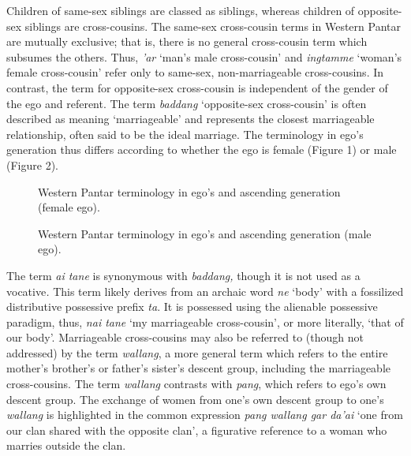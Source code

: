 Children of same-sex siblings are classed as siblings, whereas children of opposite-sex siblings are cross-cousins. The same-sex cross-cousin terms in Western Pantar are mutually exclusive; that is, there is no general cross-cousin term which subsumes the others. Thus, \textit{'ar} `man's male cross-cousin' and \textit{ingtamme} `woman's female cross-cousin' refer only to same-sex, non-marriageable cross-cousins. In contrast, the term for opposite-sex cross-cousin is independent of the gender of the ego and referent. The term \textit{baddang} `opposite-sex cross-cousin' is often described as meaning `marriageable' and represents the closest marriageable relationship, often said to be the ideal marriage. The terminology in ego's generation thus differs according to whether the ego is female (Figure 1) or male (Figure 2).

\begin{figure}
\caption{Western Pantar terminology in ego's and ascending generation (female ego). }
\end{figure}

\begin{figure}
\caption{Western Pantar terminology in ego's and ascending generation (male ego).}
\end{figure}


The term \textit{ai tane} is synonymous with \textit{baddang,} though it is not used as a vocative\textit{.} This term likely derives from an archaic word \textit{ne} `body' with a fossilized distributive possessive prefix \textit{ta}.\textit{} It is possessed using the alienable possessive paradigm, thus, \textit{nai tane} `my marriageable cross-cousin', or more literally, `that of our body'. Marriageable cross-cousins may also be referred to (though not addressed) by the term \textit{wallang}, a more general term which refers to the entire mother's brother's or father's sister's descent group, including the marriageable cross-cousins. The term \textit{wallang} contrasts with \textit{pang}, which refers to ego's own descent group. The exchange of women from one's own descent group to one's \textit{wallang} is highlighted in the common expression \textit{pang wallang gar da'ai} `one from our clan shared with the opposite clan', a figurative reference to a woman who marries outside the clan.

